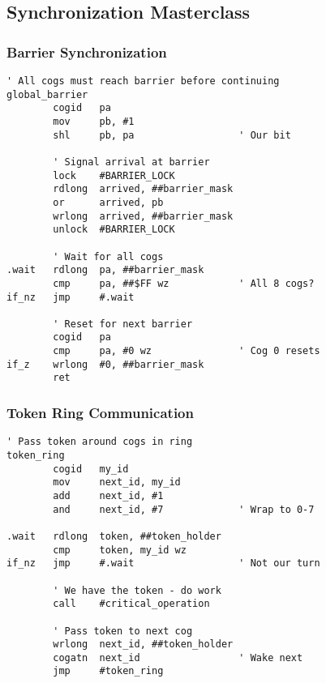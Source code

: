 \documentclass[11pt]{book}
\begin{document}
\hypertarget{synchronization-masterclass}{%
\subsection{Synchronization
Masterclass}\label{synchronization-masterclass}}

\hypertarget{barrier-synchronization}{%
\subsubsection{Barrier Synchronization}\label{barrier-synchronization}}

\begin{lstlisting}
' All cogs must reach barrier before continuing
global_barrier
        cogid   pa
        mov     pb, #1
        shl     pb, pa                  ' Our bit
        
        ' Signal arrival at barrier
        lock    #BARRIER_LOCK
        rdlong  arrived, ##barrier_mask
        or      arrived, pb
        wrlong  arrived, ##barrier_mask
        unlock  #BARRIER_LOCK
        
        ' Wait for all cogs
.wait   rdlong  pa, ##barrier_mask
        cmp     pa, ##$FF wz            ' All 8 cogs?
if_nz   jmp     #.wait
        
        ' Reset for next barrier
        cogid   pa
        cmp     pa, #0 wz               ' Cog 0 resets
if_z    wrlong  #0, ##barrier_mask
        ret
\end{lstlisting}

\hypertarget{token-ring-communication}{%
\subsubsection{Token Ring
Communication}\label{token-ring-communication}}

\begin{lstlisting}
' Pass token around cogs in ring
token_ring
        cogid   my_id
        mov     next_id, my_id
        add     next_id, #1
        and     next_id, #7             ' Wrap to 0-7
        
.wait   rdlong  token, ##token_holder
        cmp     token, my_id wz
if_nz   jmp     #.wait                  ' Not our turn
        
        ' We have the token - do work
        call    #critical_operation
        
        ' Pass token to next cog
        wrlong  next_id, ##token_holder
        cogatn  next_id                 ' Wake next
        jmp     #token_ring
\end{lstlisting}
\end{document}

